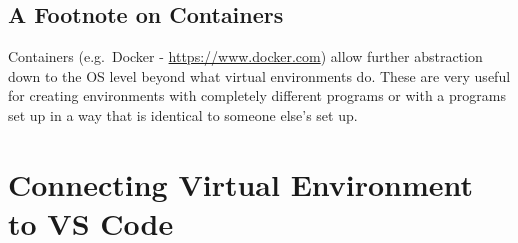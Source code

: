 \documentclass[12pt]{article}
\begin{document}
        \subsection{A Footnote on Containers}
        Containers (e.g.\ Docker - \url{https://www.docker.com}) allow further abstraction down to the OS level beyond what virtual environments do.
        These are very useful for creating environments with completely different programs or with a programs set up in a way that is identical to someone else's set up.
    \section{Connecting Virtual Environment to VS Code}
        
\end{document}
